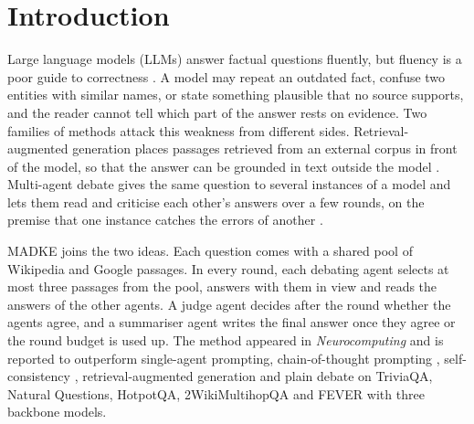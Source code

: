 \section{Introduction}
\label{sec:introduction}

Large language models (LLMs) answer factual questions fluently, but fluency is a poor guide to correctness \cite{brown2020gpt3,ji2023hallucination}. A model may repeat an outdated fact, confuse two entities with similar names, or state something plausible that no source supports, and the reader cannot tell which part of the answer rests on evidence. Two families of methods attack this weakness from different sides. Retrieval-augmented generation places passages retrieved from an external corpus in front of the model, so that the answer can be grounded in text outside the model \cite{lewis2020rag,guu2020realm,izacard2021fid}. Multi-agent debate gives the same question to several instances of a model and lets them read and criticise each other's answers over a few rounds, on the premise that one instance catches the errors of another \cite{du2024debate,liang2024divergent,chan2024chateval}.

MADKE \cite{wang2025madke} joins the two ideas. Each question comes with a shared pool of Wikipedia and Google passages. In every round, each debating agent selects at most three passages from the pool, answers with them in view and reads the answers of the other agents. A judge agent decides after the round whether the agents agree, and a summariser agent writes the final answer once they agree or the round budget is used up. The method appeared in \emph{Neurocomputing} and is reported to outperform single-agent prompting, chain-of-thought prompting \cite{wei2022cot}, self-consistency \cite{wang2023sc}, retrieval-augmented generation and plain debate on TriviaQA, Natural Questions, HotpotQA, 2WikiMultihopQA and FEVER with three backbone models.

